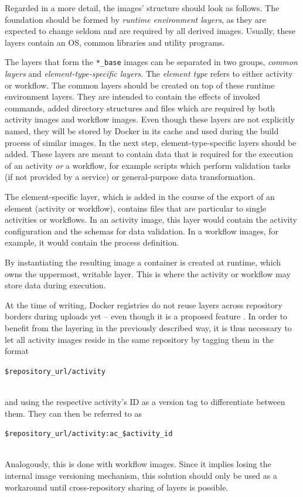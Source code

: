   Regarded in a more detail, the images' structure should look as follows.
  The foundation should be formed by \emph{runtime environment layers}, as they are expected to change  seldom and are required by all derived images. Usually, these layers contain an \ac{OS}, common libraries and utility programs.

  The layers that form the \texttt{*\_base} images can be separated in two groups, \emph{common layers} and \emph{element-type-specific layers}. The \emph{element type} refers to either activity or workflow.
  The common layers should be created on top of these runtime environment layers. They are intended to contain the effects of invoked commands, added directory structures and files which are required by both activity images and workflow images. Even though these layers are not explicitly named, they will be stored by Docker in its cache and used during the build process of similar images.
  In the next step, element-type-specific layers should be added. These layers are meant to contain data that is required for the execution of an activity \emph{or} a workflow, for example scripts which perform validation tasks (if not provided by a service) or general-purpose data transformation.

  The element-specific layer, which is added in the course of the export of an element (activity or workflow), contains files that are particular to single activities or workflows. In an activity image, this layer would contain the activity configuration and the schemas for data validation. In a workflow images, for example, it would contain the process definition.

  By instantiating the resulting image a container is created at runtime, which owns the uppermost, writable layer. This is where the activity or workflow may store data during execution.

  At the time of writing, Docker registries do not reuse layers across repository borders during uploads yet -- even though it is a proposed feature \cite{Mcgowan2015Proposal}. In order to benefit from the layering in the previously described way, it is thus necessary to let all activity images reside in the same repository by tagging them in the format
  \\ [0.5ex]
  \centerline{\texttt{\$repository\_url/activity}}
  \\ [0.5ex]
  and using the respective activity's \ac{ID} as a version tag to differentiate between them. They can then be referred to as
  \\ [0.5ex]
  \centerline{\texttt{\$repository\_url/activity:ac\_\$activity\_id}}
  \\ [0.5ex]
  Analogously, this is done with workflow images. Since it implies losing the internal image versioning mechanism, this solution should only be used as a workaround until cross-repository sharing of layers is possible.


